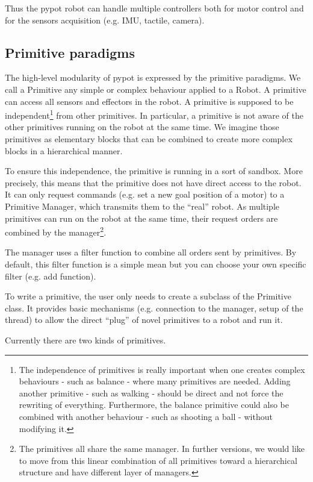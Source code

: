 Thus the pypot robot can handle multiple controllers both for motor control and for the sensors acquisition (e.g. IMU, tactile, camera).


\subsection{Primitive paradigms} %

The high-level modularity of pypot is expressed by the primitive paradigms. We call a Primitive any simple or complex behaviour applied to a Robot. A primitive can access all sensors and effectors in the robot. A primitive is supposed to be independent\footnote{The independence of primitives is really important when one creates complex behaviours - such as balance - where many primitives are needed. Adding another primitive - such as walking - should be direct and not force the rewriting of everything. Furthermore, the balance primitive could also be combined with another behaviour - such as shooting a ball - without modifying it.} from other primitives. In particular, a primitive is not aware of the other primitives running on the robot at the same time. We imagine those primitives as elementary blocks that can be combined to create more complex blocks in a hierarchical manner.

To ensure this independence, the primitive is running in a sort of sandbox. More precisely, this means that the primitive does not have direct access to the robot. It can only request commands (e.g. set a new goal position of a motor) to a Primitive Manager, which transmits them to the “real” robot. As multiple primitives can run on the robot at the same time, their request orders are combined by the manager\footnote{The primitives all share the same manager. In further versions, we would like to move from this linear combination of all primitives toward a hierarchical structure and have different layer of managers.}.

The manager uses a filter function to combine all orders sent by primitives. By default, this filter function is a simple mean but you can choose your own specific filter (e.g. add function).

To write a primitive, the user only needs to create a subclass of the Primitive class. It provides basic mechanisms (e.g. connection to the manager, setup of the thread) to allow the direct “plug” of novel primitives to a robot and run it.

Currently there are two kinds of primitives.


